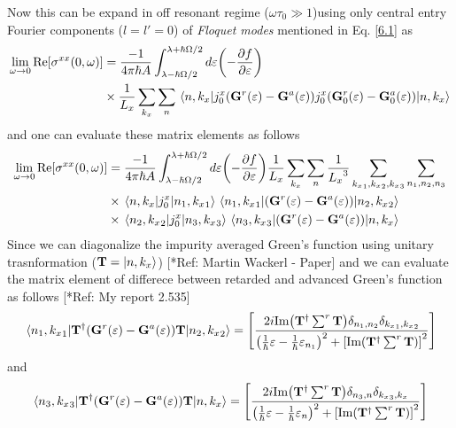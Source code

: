 \noindent
Now this can be expand in off resonant regime ($\omega\tau_0 \gg 1$)using only central entry Fourier components ($l=l'=0$) of \textit{Floquet modes} mentioned in Eq. \eqref{6.1} as
\begin{equation} \label{7.2}
  \begin{aligned}
    \lim_{\omega \to 0}
    \text{Re}[{\sigma}^{xx}(0,\omega)] & =
    \frac{-1}{4\pi\hbar A}
    \int_{\lambda-\hbar\Omega/2}^{\lambda+ \hbar\Omega/2} d\varepsilon
    \qty(
    -\frac{\partial f}{\partial \varepsilon})
    \\
    & \times
    \frac{1}{L_x} \sum_{k_x}
    \sum_{n}
    \mel{n,k_x}{
    {j}^x_0
    \qty(
    \mathbf{G}^{r} (\varepsilon) - \mathbf{G}^{a} (\varepsilon)
    )
    {j}^x_0
    \qty(
    \mathbf{G}^{r}_0 (\varepsilon) - \mathbf{G}^{a}_0 (\varepsilon)
    )
    }
    {n,k_x}
  \end{aligned}
\end{equation}
and one can evaluate these matrix elements as follows
\begin{equation} \label{7.3}
  \begin{aligned}
    \lim_{\omega \to 0}
    \text{Re}[{\sigma}^{xx}(0,\omega)] & =
    \frac{-1}{4\pi\hbar A}
    \int_{\lambda-\hbar\Omega/2}^{\lambda+ \hbar\Omega/2} d\varepsilon
    \qty(
    -\frac{\partial f}{\partial \varepsilon})
    \frac{1}{L_x} \sum_{k_x} \sum_{n}
    \frac{1}{{L_x}^3} \sum_{{k_x}_1,{k_x}_2,{k_x}_3}
    \sum_{n_1,n_2,n_3}
    \\
    & \times
    \mel{n,k_x}{
    {j}^x_0}
    {n_1,{k_x}_1}
    \mel{{n_1,{k_x}_1}}{
    \qty(
    \mathbf{G}^{r} (\varepsilon) - \mathbf{G}^{a} (\varepsilon)
    )}
    {n_2,{k_x}_2} \\
    & \times
    \mel{n_2,{k_x}_2}{
    {j}^x_0}
    {n_3,{k_x}_3}
    \mel{n_3,{k_x}_3}{
    \qty(
    \mathbf{G}^{r} (\varepsilon) - \mathbf{G}^{a} (\varepsilon)
    )
    }
    {n,k_x}
  \end{aligned}
\end{equation}
Since we can diagonalize the impurity averaged Green's function using unitary trasnformation ($\mathbf{T} = \ket{n,k_x}$) [*Ref: Martin Wackerl - Paper] and we can evaluate the matrix element of differece between retarded and advanced Green's function as follows
[*Ref: My report 2.535]
\begin{equation} \label{7.4}
  \mel{{n_1,{k_x}_1}}{
  \mathbf{T}^{\dagger}
  \qty(
  \mathbf{G}^{r} (\varepsilon) - \mathbf{G}^{a} (\varepsilon)
  )\mathbf{T}}
  {n_2,{k_x}_2} =
  \qty[
  \frac{2i \text{Im}\qty(\mathbf{T}^{\dagger} \sum^r \mathbf{T})
  \delta_{n_1,n_2}\delta_{{k_x}_1,{k_x}_2}}
  {
  \qty(
  \frac{1}{\hbar}\varepsilon -
  \frac{1}{\hbar}\varepsilon_{n_1}
  )^2
  + \qty[\text{Im}\qty(\mathbf{T}^{\dagger} \sum^r \mathbf{T})]^2
  }]
\end{equation}
and
\begin{equation} \label{7.5}
  \mel{{n_3,{k_x}_3}}{
  \mathbf{T}^{\dagger}
  \qty(
  \mathbf{G}^{r} (\varepsilon) - \mathbf{G}^{a} (\varepsilon)
  )\mathbf{T}}
  {n,{k_x}} =
  \qty[
  \frac{2i \text{Im}\qty(\mathbf{T}^{\dagger} \sum^r \mathbf{T})
  \delta_{n_3,n}\delta_{{k_x}_3,{k_x}}}
  {
  \qty(
  \frac{1}{\hbar}\varepsilon -
  \frac{1}{\hbar}\varepsilon_{n}
  )^2
  + \qty[\text{Im}\qty(\mathbf{T}^{\dagger} \sum^r \mathbf{T})]^2
  }]
\end{equation}

